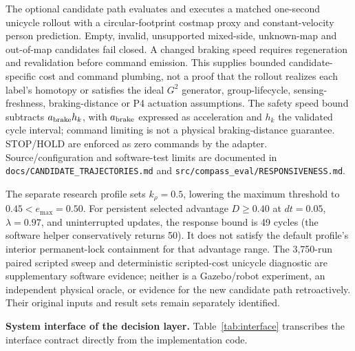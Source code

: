 \documentclass[11pt]{article}
\newcommand{\code}[1]{\texttt{#1}}
\begin{document}
The optional candidate path evaluates and executes a matched one-second unicycle rollout with a circular-footprint costmap proxy and constant-velocity person prediction. Empty, invalid, unsupported mixed-side, unknown-map and out-of-map candidates fail closed. A changed braking speed requires regeneration and revalidation before command emission. This supplies bounded candidate-specific cost and command plumbing, not a proof that the rollout realizes each label's homotopy or satisfies the ideal $G^2$ generator, group-lifecycle, sensing-freshness, braking-distance or P4 actuation assumptions. The safety speed bound subtracts $a_{\rm brake}h_k$, with $a_{\rm brake}$ expressed as acceleration and $h_k$ the validated cycle interval; command limiting is not a physical braking-distance guarantee. STOP/HOLD are enforced as zero commands by the adapter. Source/configuration and software-test limits are documented in \code{docs/CANDIDATE\_TRAJECTORIES.md} and \code{src/compass\_eval/RESPONSIVENESS.md}.

The separate research profile sets $k_\rho=0.5$, lowering the maximum threshold to $0.45<e_{\max}=0.50$. For persistent selected advantage $D\ge0.40$ at $dt=0.05$, $\lambda=0.97$, and uninterrupted updates, the response bound is 49 cycles (the software helper conservatively returns 50). It does not satisfy the default profile's interior permanent-lock containment for that advantage range. The 3,750-run paired scripted sweep and deterministic scripted-cost unicycle diagnostic are supplementary software evidence; neither is a Gazebo/robot experiment, an independent physical oracle, or evidence for the new candidate path retroactively. Their original inputs and result sets remain separately identified.

\textbf{System interface of the decision layer.} Table~\ref{tab:interface} transcribes the interface contract directly from the implementation code.
\end{document}
